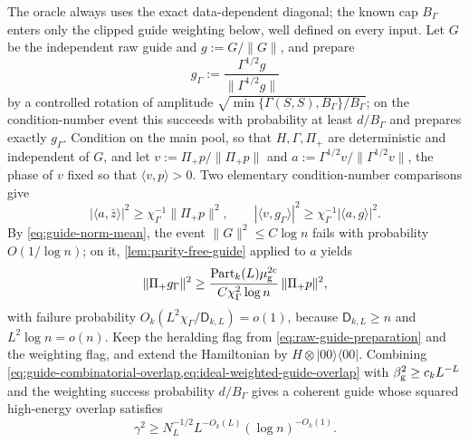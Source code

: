 \documentclass[11pt]{article}
\theoremstyle{definition}
\theoremstyle{remark}
\newcommand{\1}{\mathbf 1}
\numberwithin{equation}{section}
\begin{document}
The oracle always uses the exact data-dependent diagonal; the known
cap $B_\Gamma$ enters only the clipped guide weighting below, well
defined on every input.  Let $G$ be
the independent raw guide and $g:=G/\|G\|$, and prepare
\begin{equation}\label{eq:weighted-guide}
 g_\Gamma:=\frac{\Gamma^{1/2}g}{\|\Gamma^{1/2}g\|}
\end{equation}
by a controlled rotation of amplitude
$\sqrt{\min\{\Gamma(S,S),B_\Gamma\}/B_\Gamma}$; on the condition-number
event this succeeds with probability at least $d/B_\Gamma$ and prepares
exactly $g_\Gamma$.  Condition on the main pool, so that
$H,\Gamma,\Pi_+$ are deterministic and independent of $G$, and let
$v:=\Pi_+p/\|\Pi_+p\|$ and $a:=\Gamma^{1/2}v/\|\Gamma^{1/2}v\|$, the
phase of $v$ fixed so that $\langle v,p\rangle>0$.  Two elementary
condition-number comparisons give
\begin{equation}\label{eq:two-condition-number-losses}
 |\langle a,\bar z\rangle|^2
 \ge\chi_\Gamma^{-1}\|\Pi_+p\|^2,
 \qquad
 |\langle v,g_\Gamma\rangle|^2
 \ge\chi_\Gamma^{-1}|\langle a,g\rangle|^2.
\end{equation}
By \cref{eq:guide-norm-mean}, the event $\|G\|^2\le C\log n$ fails with
probability $O(1/\log n)$; on it, \cref{lem:parity-free-guide} applied
to $a$ yields
\begin{equation}\label{eq:ideal-weighted-guide-overlap}
 \|\Pi_+g_\Gamma\|^2
 \ge
 \frac{\operatorname{Part}_k(L)\mu_{\rm g}^{2c}}
 {C\chi_\Gamma^2\log n}\,\|\Pi_+p\|^2,
\end{equation}
with failure probability
$O_k(L^2\chi_\Gamma/\mathsf D_{k,L})=o(1)$, because
$\mathsf D_{k,L}\ge n$ and $L^2\log n=o(n)$.  Keep the heralding flag
from \cref{eq:raw-guide-preparation} and the weighting flag, and extend
the Hamiltonian by $H\otimes|00\rangle\langle00|$.  Combining
\cref{eq:guide-combinatorial-overlap,eq:ideal-weighted-guide-overlap}
with $\beta_{\rm g}^2\ge c_kL^{-L}$ and the weighting success
probability $d/B_\Gamma$ gives a coherent guide whose squared
high-energy overlap satisfies
\begin{equation}\label{eq:prepared-guide-overlap}
 \gamma^2
 \ge N_L^{-1/2}L^{-O_k(L)}(\log n)^{-O_k(1)}.
\end{equation}
\end{document}
